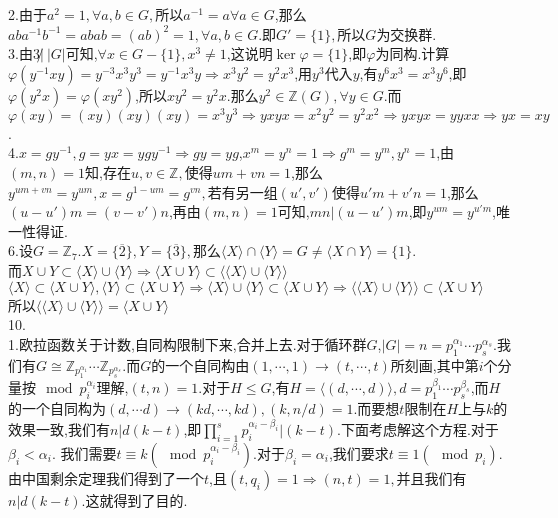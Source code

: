 \documentclass[b5paper]{ctexart}
\begin{document}
\pagestyle{plain}
\noindent
{}
2.由于$a^2=1,\forall a,b\in G,$所以$a^{-1}=a\forall a\in G$,那么$aba^{-1}b^{-1}=abab=(ab)^2=1,\forall a,b\in G.$即$G'=\{1\},$所以$G$为交换群.\\
3.由$3\not |~|G|$可知,$\forall x\in G-\{1\},x^3\neq 1$,这说明$\ker\varphi=\{1\}$,即$\varphi$为同构.计算$\varphi(y^{-1}xy)=y^{-3}x^3y^3=y^{-1}x^3y\Rightarrow x^3y^2=y^2x^3$,用$y^3$代入$y$,有$y^6x^3=x^3y^6$,即$\varphi(y^2x)=\varphi(xy^2)$,所以$xy^2=y^2x$.那么$y^2\in\mathbb{Z}(G),\forall y\in G$.而$\varphi(xy)=(xy)(xy)(xy)=x^3y^3\Rightarrow yxyx=x^2y^2=y^2x^2\Rightarrow yxyx=yyxx\Rightarrow yx=xy$.\\
4.$x=gy^{-1},g=yx=ygy^{-1}\Rightarrow gy=yg$,$x^m=y^n=1\Rightarrow g^m=y^m,y^n=1$,由$(m,n)=1$知,存在$u,v\in\mathbb{Z},$使得$um+vn=1$,那么$y^{um+vn}=y^{um},x=g^{1-um}=g^{vn},$若有另一组$(u',v')$使得$u'm+v'n=1$,那么$(u-u')m=(v-v')n$,再由$(m,n)=1$可知,$mn|(u-u')m$,即$y^{um}=y^{u'm}$,唯一性得证.\\
6.设$G=\mathbb{Z}_7.X=\{\overline{2}\},Y=\{\overline{3}\},$那么$\langle X\rangle\cap \langle Y\rangle=G\neq\langle X\cap Y\rangle=\{1\}$.\\
而$X\cup Y\subset \langle X\rangle\cup \langle Y\rangle\Rightarrow \langle X\cup Y\rangle\subset \langle\langle X\rangle\cup \langle Y\rangle\rangle$\\
$\langle X\rangle \subset \langle X\cup Y\rangle ,\langle Y\rangle\subset \langle X\cup Y\rangle\Rightarrow \langle X\rangle\cup \langle Y\rangle \subset \langle X\cup Y\rangle\Rightarrow \langle\langle X\rangle\cup \langle Y\rangle\rangle \subset \langle X\cup Y\rangle$\\
所以$\langle\langle X\rangle\cup \langle Y\rangle\rangle= \langle X\cup Y\rangle$\\
10.\\
1.欧拉函数关于计数,自同构限制下来,合并上去.对于循环群$G$,$|G|=n=p_1^{\alpha_1}\cdots p_s^{\alpha_s}$.我们有$G\cong \mathbb{Z}_{p_1^{\alpha_1}}\cdots \mathbb{Z}_{p_s^{\alpha_s}}$.而$G$的一个自同构由$(1,\cdots,1)\to (t,\cdots,t)$所刻画,其中第$i$个分量按$\mod{p_i^{\alpha_i}}$理解,$(t,n)=1$.对于$H\leq G$,有$H=\langle (d,\cdots,d)\rangle,d=p_1^{\beta_1}\cdots p_s^{\beta_s}$,而$H$的一个自同构为$(d,\cdots d)\to (kd,\cdots,kd),(k,n/d)=1$.而要想$t$限制在$H$上与$k$的效果一致,我们有$n|d(k-t)$,即$\prod_{i=1}^sp_i^{\alpha_i-\beta_i}|(k-t)$.下面考虑解这个方程.对于$\beta_i <\alpha_i $.
我们需要$t\equiv k(\mod{p_i^{\alpha_i-\beta_i}})$.对于$\beta_i=\alpha_i$,我们要求$t\equiv 1(\mod{p_i})$.由中国剩余定理我们得到了一个$t$,且$(t,q_i)=1\Rightarrow (n,t)=1,$并且我们有$n|d(k-t)$.这就得到了目的.\\
\end{document}
